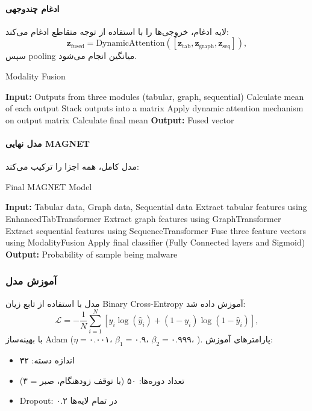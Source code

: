 \paragraph{ادغام چندوجهی}
لایه ادغام، خروجی‌ها را با استفاده از توجه متقاطع ادغام می‌کند:
\[
\mathbf{z}_{\text{fused}} = \text{DynamicAttention}([\mathbf{z}_{\text{tab}}, \mathbf{z}_{\text{graph}}, \mathbf{z}_{\text{seq}}]),
\]
سپس pooling میانگین انجام می‌شود.
\begin{LTR}
\begin{algorithm}[h]
\caption{Modality Fusion}
\begin{algorithmic}[1]
\STATE \textbf{Input:} Outputs from three modules (tabular, graph, sequential)
\STATE Calculate mean of each output
\STATE Stack outputs into a matrix
\STATE Apply dynamic attention mechanism on output matrix
\STATE Calculate final mean
\STATE \textbf{Output:} Fused vector
\end{algorithmic}
\end{algorithm}
\end{LTR}

\paragraph{مدل نهایی MAGNET}
مدل کامل، همه اجزا را ترکیب می‌کند:
\begin{LTR}
\begin{algorithm}[h]
\caption{Final MAGNET Model}
\begin{algorithmic}[1]
\STATE \textbf{Input:} Tabular data, Graph data, Sequential data
\STATE Extract tabular features using EnhancedTabTransformer
\STATE Extract graph features using GraphTransformer
\STATE Extract sequential features using SequenceTransformer
\STATE Fuse three feature vectors using ModalityFusion
\STATE Apply final classifier (Fully Connected layers and Sigmoid)
\STATE \textbf{Output:} Probability of sample being malware
\end{algorithmic}
\end{algorithm}
\end{LTR}

\subsubsection{آموزش مدل}
مدل با استفاده از تابع زیان Binary Cross-Entropy آموزش داده شد:
\[
\mathcal{L} = -\frac{1}{N} \sum_{i=1}^N [y_i \log(\hat{y}_i) + (1 - y_i) \log(1 - \hat{y}_i)],
\]
با بهینه‌ساز Adam (\( \eta = ۰.۰۰۱ \)، \( \beta_1 = ۰.۹ \)، \( \beta_2 = ۰.۹۹۹ \)، ). پارامترهای آموزش:
\begin{itemize}
    \item اندازه دسته: ۳۲
    \item تعداد دوره‌ها: ۵۰ (با توقف زودهنگام، صبر = ۳)
    \item Dropout: ۰.۲ در تمام لایه‌ها
\end{itemize}

